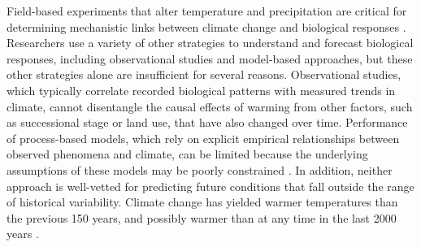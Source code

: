 \documentclass{article}
\begin{document}
\par Field-based experiments that alter temperature and precipitation are critical for determining mechanistic links between climate change and biological responses \citep[e.g.,][]{box1978,williams2007,gelman2014}. Researchers use a variety of other strategies to understand and forecast biological responses, including observational studies and model-based approaches, but these other strategies alone are insufficient for several reasons. Observational studies, which typically correlate recorded biological patterns with measured trends in climate, cannot disentangle the causal effects of warming from other factors, such as successional stage or land use, that have also changed over time. Performance of process-based models, which rely on explicit empirical relationships between observed phenomena and climate, can be limited because the underlying assumptions of these models may be poorly constrained \citep [e.g.,][]{pearson2004,ibanez2006,swab2012,chuine2016}. 
In addition, neither approach is well-vetted for predicting future conditions that fall outside the range of historical variability. Climate change has yielded warmer temperatures than the previous 150 years, and possibly warmer than at any time in the last 2000 years \citep{ohlemuller2006,williams2007,williams2007b,ipcc2013}.  
\end{document}
